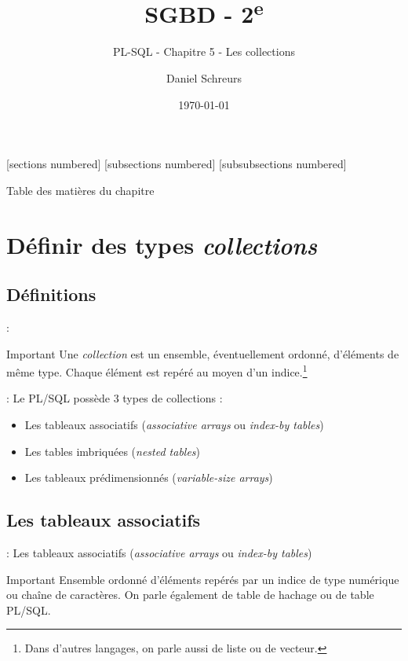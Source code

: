 \documentclass[10pt]{beamer}
\title{SGBD - 2\textsuperscript{e}}
\subtitle{PL-SQL - Chapitre 5 - Les collections}
\date{\today}
\author{Daniel Schreurs}
\institute{Haute École de Province de Liège}
\begin{document}
\maketitle

[sections numbered]
[subsections numbered]
[subsubsections numbered]
\begin{frame}[allowframebreaks]{Table des matières du chapitre}
    \tableofcontents[subsectionstyle=show/show/hide,subsubsectionstyle=show/show/hide,]
\end{frame}

\section{Définir des types \textit{collections}}
\tocss
\subsection{Définitions}
\begin{frame}{\secname : \subsecname}
    \begin{alertblock}{Important}
        Une \emph{collection} est un ensemble, éventuellement ordonné, d'éléments de même type.
        Chaque élément est repéré au moyen d'un indice.\footnote{Dans d'autres langages, on parle aussi de liste ou de vecteur.}
    \end{alertblock}
\end{frame}

\begin{frame}{\secname : \subsecname}
    Le PL/SQL possède 3 types de collections :
    \begin{itemize}
        \item Les tableaux associatifs (\emph{associative arrays} ou \emph{index-by tables})
        \item Les tables imbriquées (\emph{nested tables})
        \item Les tableaux prédimensionnés (\emph{variable-size arrays})
    \end{itemize}
\end{frame}
\subsection{Les tableaux associatifs}
\begin{frame}{\secname : \subsecname}
    Les tableaux associatifs (\emph{associative arrays} ou \emph{index-by tables})
    \begin{alertblock}{Important}
        Ensemble ordonné d'éléments repérés par un indice de type numérique ou chaîne de caractères. On parle également de table de hachage ou de table PL/SQL.
    \end{alertblock}
\end{frame}
\end{document}
